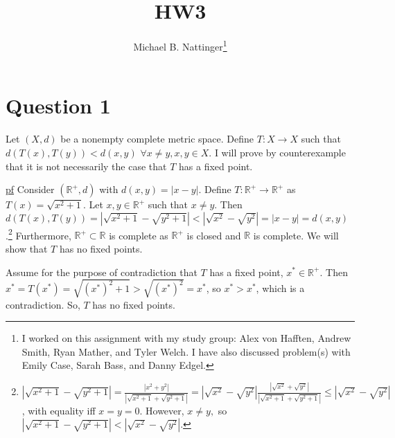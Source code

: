 \documentclass[11pt]{article} %
\title{HW3}
\author{Michael B. Nattinger\footnote{I worked on this assignment with my study group: Alex von Hafften, Andrew Smith, Ryan Mather, and Tyler Welch. I have also discussed problem(s) with Emily Case, Sarah Bass, and Danny Edgel.}}
\begin{document}
\maketitle

\section{Question 1}
Let $(X, d)$ be a nonempty complete metric space. Define $T: X \rightarrow X$ such that $d(T(x),T(y))<d(x,y)$ $\forall x \neq y, x,y \in X.$ I will prove by counterexample that it is not necessarily the case that $T$ has a fixed point.

\underline{pf} Consider $(\mathbb{R}^{+},d)$ with $d(x,y) = |x-y|$. Define $T: \mathbb{R}^{+} \rightarrow \mathbb{R}^{+}$ as $T(x) = \sqrt{x^2 + 1}$. Let $x,y \in \mathbb{R}^{+}$ such that $x \neq y$. Then $d(T(x),T(y)) = |\sqrt{x^2 + 1} - \sqrt{y^2 +1}| < |\sqrt{x^2} - \sqrt{y^2}| = |x - y| = d(x,y)$.\footnote{ $ |\sqrt{x^2 + 1} - \sqrt{y^2 +1}| = \frac{|x^2 + y^2|}{|\sqrt{x^2 + 1} + \sqrt{y^2 +1}|}  = |\sqrt{x^2} - \sqrt{y^2}| \frac{|\sqrt{x^2} + \sqrt{y^2}|}{|\sqrt{x^2 + 1} + \sqrt{y^2 + 1}|} \leq |\sqrt{x^2} - \sqrt{y^2}|$, with equality iff $x=y=0.$ However, $x \neq y,$ so $|\sqrt{x^2 + 1} - \sqrt{y^2 +1}| < |\sqrt{x^2} - \sqrt{y^2}|$. } Furthermore, $\mathbb{R}^{+} \subset \mathbb{R}$ is complete as $\mathbb{R}^{+}$ is closed and $\mathbb{R}$ is complete. We will show that $T$ has no fixed points.

Assume for the purpose of contradiction that $T$ has a fixed point, $x^* \in \mathbb{R}^{+}$. Then $x^* = T(x^*) = \sqrt{(x^*)^2 + 1} > \sqrt{(x^*)^2} = x^*$, so $x^* > x^*$, which is a contradiction. So, $T$ has no fixed points.

%
\end{document}

